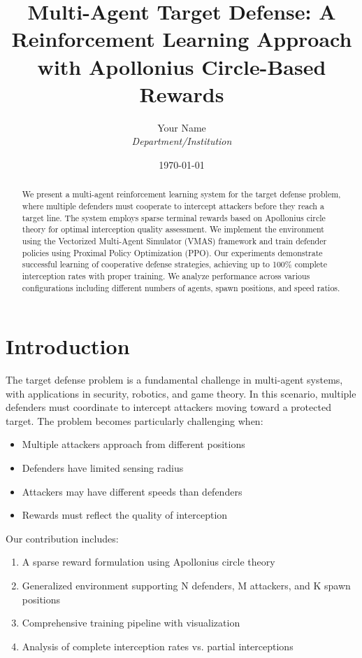 \documentclass[11pt,a4paper]{article}
\title{Multi-Agent Target Defense: A Reinforcement Learning Approach with Apollonius Circle-Based Rewards}
\author{Your Name\\
\textit{Department/Institution}}
\date{\today}
\begin{document}
\maketitle

\begin{abstract}
We present a multi-agent reinforcement learning system for the target defense problem, where multiple defenders must cooperate to intercept attackers before they reach a target line. The system employs sparse terminal rewards based on Apollonius circle theory for optimal interception quality assessment. We implement the environment using the Vectorized Multi-Agent Simulator (VMAS) framework and train defender policies using Proximal Policy Optimization (PPO). Our experiments demonstrate successful learning of cooperative defense strategies, achieving up to 100\% complete interception rates with proper training. We analyze performance across various configurations including different numbers of agents, spawn positions, and speed ratios.
\end{abstract}

\section{Introduction}

The target defense problem is a fundamental challenge in multi-agent systems, with applications in security, robotics, and game theory. In this scenario, multiple defenders must coordinate to intercept attackers moving toward a protected target. The problem becomes particularly challenging when:
\begin{itemize}
    \item Multiple attackers approach from different positions
    \item Defenders have limited sensing radius
    \item Attackers may have different speeds than defenders
    \item Rewards must reflect the quality of interception
\end{itemize}

Our contribution includes:
\begin{enumerate}
    \item A sparse reward formulation using Apollonius circle theory
    \item Generalized environment supporting N defenders, M attackers, and K spawn positions
    \item Comprehensive training pipeline with visualization
    \item Analysis of complete interception rates vs. partial interceptions
\end{enumerate}
\end{document}
